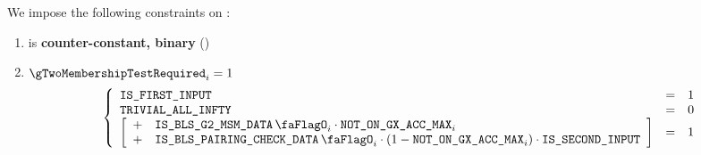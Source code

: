 \noindent
We impose the following constraints on \gTwoMembershipTestRequired{}:
\begin{enumerate}
    \item \gTwoMembershipTestRequired{} is \textbf{counter-constant, binary} \quad (\trash)
    \item \If $\gTwoMembershipTestRequired_{i} = 1$ \Then
        \[
            \left\{ \begin{array}{lcl}
                \isFirstInput & = & 1 \\
                \trivialAllInf & = & 0 \\
                \left[ \begin{array}{cl}
                    + & \isBlsGTwoMsmData_{i} \cdot \notOnGXAccMax_{i}  \\
                    + & \isBlsPairingCheckData_{i} \cdot (1 - \notOnGXAccMax_{i}) \cdot \isSecondInput \\
                \end{array} \right] & = & 1 \\
            \end{array} \right.
        \]
\end{enumerate}


